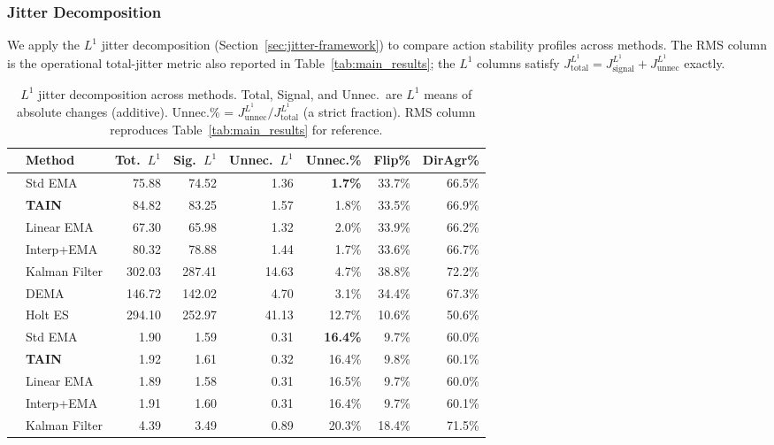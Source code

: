 \documentclass[11pt,a4paper]{article}
\begin{document}
\subsubsection{Jitter Decomposition}

We apply the $L^1$ jitter decomposition (Section~\ref{sec:jitter-framework})
to compare action stability profiles across methods. The RMS column is the
operational total-jitter metric also reported in Table~\ref{tab:main_results};
the $L^1$ columns satisfy $J_{\text{total}}^{L^1} = J_{\text{signal}}^{L^1}
+ J_{\text{unnec}}^{L^1}$ exactly.

\begin{table}[h]
\centering
\caption{$L^1$ jitter decomposition across methods. Total, Signal, and Unnec.\
are $L^1$ means of absolute changes (additive). Unnec.\% =
$J_{\text{unnec}}^{L^1} / J_{\text{total}}^{L^1}$ (a strict fraction).
RMS column reproduces Table~\ref{tab:main_results} for reference.}
\label{tab:jitter}
\small
\begin{tabular}{ll rrr r rr}
\toprule
& Method & Tot.\ $L^1$ & Sig.\ $L^1$ & Unnec.\ $L^1$ & Unnec.\% & Flip\% & DirAgr\% \\
\midrule
\multirow{7}{*}{\rotatebox{90}{Retail}}
& Std EMA       &  75.88 &  74.52 &  1.36 & \textbf{1.7\%} & 33.7\% & 66.5\% \\
& \textbf{TAIN} &  84.82 &  83.25 &  1.57 & 1.8\% & 33.5\% & 66.9\% \\
& Linear EMA    &  67.30 &  65.98 &  1.32 & 2.0\% & 33.9\% & 66.2\% \\
& Interp+EMA    &  80.32 &  78.88 &  1.44 & 1.7\% & 33.6\% & 66.7\% \\
& Kalman Filter & 302.03 & 287.41 & 14.63 & 4.7\% & 38.8\% & 72.2\% \\
& DEMA          & 146.72 & 142.02 &  4.70 & 3.1\% & 34.4\% & 67.3\% \\
& Holt ES       & 294.10 & 252.97 & 41.13 & 12.7\% & 10.6\% & 50.6\% \\
\midrule
\multirow{7}{*}{\rotatebox{90}{Sensor}}
& Std EMA       &   1.90 &   1.59 &  0.31 & \textbf{16.4\%} &  9.7\% & 60.0\% \\
& \textbf{TAIN} &   1.92 &   1.61 &  0.32 & 16.4\% &  9.8\% & 60.1\% \\
& Linear EMA    &   1.89 &   1.58 &  0.31 & 16.5\% &  9.7\% & 60.0\% \\
& Interp+EMA    &   1.91 &   1.60 &  0.31 & 16.4\% &  9.7\% & 60.1\% \\
& Kalman Filter &   4.39 &   3.49 &  0.89 & 20.3\% & 18.4\% & 71.5\% \\

\end{tabular}
\end{table}
\end{document}
